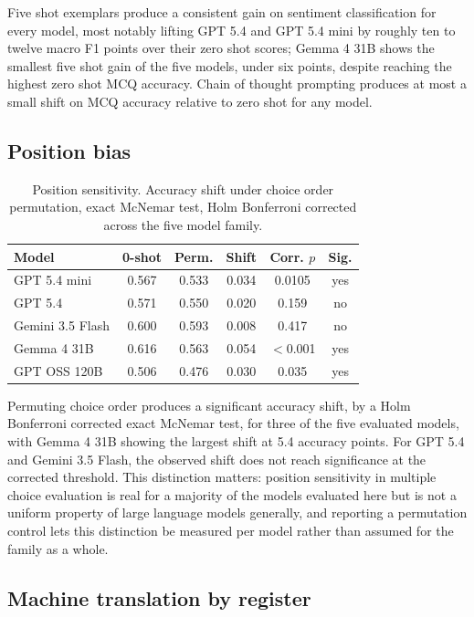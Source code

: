 \documentclass[pdflatex,sn-mathphys-ay]{sn-jnl}
\begin{document}
Five shot exemplars produce a consistent gain on sentiment classification for every model, most notably lifting GPT 5.4 and GPT 5.4 mini by roughly ten to twelve macro F1 points over their zero shot scores; Gemma 4 31B shows the smallest five shot gain of the five models, under six points, despite reaching the highest zero shot MCQ accuracy. Chain of thought prompting produces at most a small shift on MCQ accuracy relative to zero shot for any model.

\subsection{Position bias}
\label{sec:position-bias}

\begin{table}[t]
\centering
\small
\begin{tabular}{lccccc}
\toprule
\textbf{Model} & \textbf{0-shot} & \textbf{Perm.} & \textbf{Shift} & \textbf{Corr. $p$} & \textbf{Sig.} \\
\midrule
GPT 5.4 mini & 0.567 & 0.533 & 0.034 & 0.0105 & yes \\
GPT 5.4 & 0.571 & 0.550 & 0.020 & 0.159 & no \\
Gemini 3.5 Flash & 0.600 & 0.593 & 0.008 & 0.417 & no \\
Gemma 4 31B & 0.616 & 0.563 & 0.054 & $<$0.001 & yes \\
GPT OSS 120B & 0.506 & 0.476 & 0.030 & 0.035 & yes \\
\bottomrule
\end{tabular}
\caption{Position sensitivity. Accuracy shift under choice order permutation, exact McNemar test, Holm Bonferroni corrected across the five model family.}
\label{tab:position-bias}
\end{table}

Permuting choice order produces a significant accuracy shift, by a Holm Bonferroni corrected exact McNemar test, for three of the five evaluated models, with Gemma 4 31B showing the largest shift at 5.4 accuracy points. For GPT 5.4 and Gemini 3.5 Flash, the observed shift does not reach significance at the corrected threshold. This distinction matters: position sensitivity in multiple choice evaluation is real for a majority of the models evaluated here but is not a uniform property of large language models generally, and reporting a permutation control lets this distinction be measured per model rather than assumed for the family as a whole.

\subsection{Machine translation by register}
\label{sec:mt-results}
\end{document}
